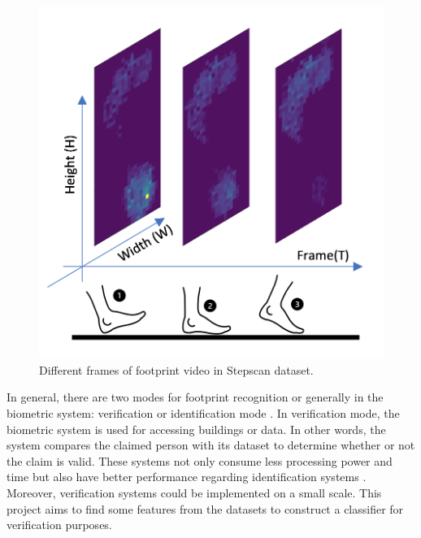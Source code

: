 \begin{figure}
    \centering
    \begin{minipage}[b]{.5\textwidth}
        \includegraphics[width=\textwidth]{figures/project/frame2.png}
    \end{minipage}
    \caption{Different frames of footprint video in Stepscan dataset.}
    \label{fig:Stepscan_dataset}
\end{figure}

In general, there are two modes for footprint recognition or generally in the biometric system: verification or identification mode \cite{Jain2004AnRecognition}. In verification mode, the biometric system is used for accessing buildings or data. In other words, the system compares the claimed person with its dataset to determine whether or not the claim is valid. These systems not only consume less processing power and time but also have better performance regarding identification systems \cite{Jain2004AnRecognition}. Moreover, verification systems could be implemented on a small scale. This project aims to find some features from the datasets to construct a classifier for verification purposes. 




